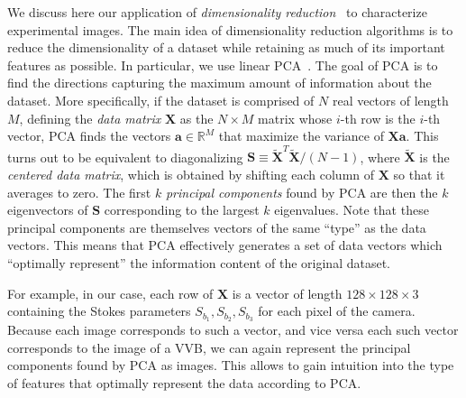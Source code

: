 \documentclass[
    floatfix, aps, pra, superscriptaddress,
	10pt, twocolumn,
    nofootinbib,
	tightenlines
]{revtex4-1}
\newcommand{\bs}[1]{\boldsymbol{#1}}
\newcommand{\RR}{\mathbb{R}}
\begin{document}
We discuss here our application of \emph{dimensionality reduction}~\cite{fodor2002survey,cunningham2008dimension} to characterize experimental images.
The main idea of dimensionality reduction algorithms is to reduce the dimensionality of a dataset while retaining as much of its important features as possible.
In particular, we use linear \ac{PCA}~\cite{jolliffe2016principal}.
The goal of \ac{PCA} is to find the directions capturing the maximum amount of information about the dataset. More specifically, if the dataset is comprised of $N$ real vectors of length $M$, defining the \emph{data matrix} $\bs X$ as the $N\times M$ matrix whose $i$-th row is the $i$-th vector, \ac{PCA} finds the vectors $\bs a\in\RR^{M}$ that maximize the variance of $\bs X\bs a$. This turns out to be equivalent to diagonalizing $\bs S\equiv \tilde{\bs X}^T\tilde{\bs X}/(N-1)$, where $\tilde{\bs X}$ is the \emph{centered data matrix}, which is obtained by shifting each column of $\bs X$ so that it averages to zero.
The first $k$ \emph{principal components} found by \ac{PCA} are then the $k$ eigenvectors of $\bs S$ corresponding to the largest $k$ eigenvalues.
Note that these principal components are themselves vectors of the same ``type'' as the data vectors. This means that \ac{PCA} effectively generates a set of data vectors which ``optimally represent'' the information content of the original dataset.

For example, in our case, each row of $\bs X$ is a vector of length $128\times128\times3$ containing the Stokes parameters $S_{b_1}, S_{b_2}, S_{b_3}$ for each pixel of the camera.
Because each image corresponds to such a vector, and vice versa each such vector corresponds to the image of a \ac{VVB}, we can again represent the principal components found by \ac{PCA} as images. This allows to gain intuition into the type of features that optimally represent the data according to \ac{PCA}.
\end{document}
